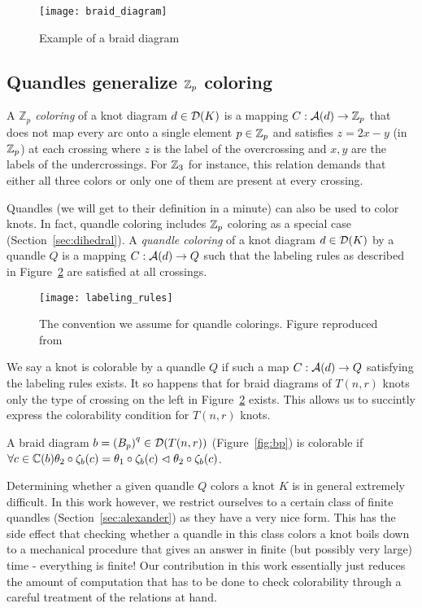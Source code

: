 \documentclass[paper.tex]{subfiles}
\begin{document}
\begin{figure}[h]
  \centering
  \texttt{[image: braid\_diagram]}
  \caption{Example of a braid diagram}\label{fig:braid_diagram}
\end{figure}

\subsection{Quandles generalize $\mathbb{Z}_p$ coloring}

A \emph{$\mathbb{Z}_p$ coloring} of a knot diagram $d \in \operatorname{\mathcal{D}}(K)$ is a mapping $C: \mathcal{A}(d) \to \mathbb{Z}_p$ that does not map every arc onto a single element $p \in \mathbb{Z}_p$ and satisfies $z = 2x - y$ (in $\mathbb{Z}_p$) at each crossing where
$z$ is the label of the overcrossing and $x,y$ are the labels of the undercrossings. For $\mathbb{Z}_3$ for instance, this relation demands that either all three colors or only one of them are present at every crossing.

Quandles (we will get to their definition in a minute) can also be used to color knots. In fact, quandle coloring includes $\mathbb{Z}_p$ coloring as a special case (Section~\ref{sec:dihedral}). A \emph{quandle coloring} of a knot diagram
$d \in \operatorname{\mathcal{D}}(K)$ by a quandle $Q$ is a mapping $C: \mathcal{A}(d) \to Q$ such that the labeling rules as described in Figure~\ref{fig:labeling_rules} are satisfied at all crossings.

\begin{figure}[H]
  \centering
  \texttt{[image: labeling\_rules]}
  \caption{The convention we assume for quandle colorings. Figure reproduced from~\cite{Cusick}}\label{fig:labeling_rules}
\end{figure}


We say a knot is colorable by a quandle $Q$ if such a map $C: \mathcal{A}(d) \to Q$ satisfying the labeling rules exists. It so happens that for braid diagrams of $T(n,r)$ knots only the type of crossing on the left in
Figure~\ref{fig:labeling_rules} exists. This allows us to succintly express the colorability condition for $T(n,r)$ knots.

A braid diagram $b = {(B_p)}^q \in \operatorname{\mathcal{D}}(T(n,r))$ (Figure~\ref{fig:bp}) is colorable if $\forall c \in  \mathbb{C}(b) \theta_2 \circ \zeta_b(c) = \theta_1 \circ \zeta_b(c) \vartriangleleft \theta_2 \circ \zeta_b(c)$.

Determining whether a given quandle $Q$ colors a knot $K$ is in general extremely difficult. In this work however, we restrict ourselves to a certain class of finite quandles (Section~\ref{sec:alexander}) as they have a very nice
form. This has the side effect that checking whether a quandle in this class colors a knot boils down to a mechanical procedure that gives an answer in finite (but possibly very large) time - everything is finite! Our contribution
in this work essentially just reduces the amount of computation that has to be done to check colorability through a careful treatment of the relations at hand.
\end{document}
